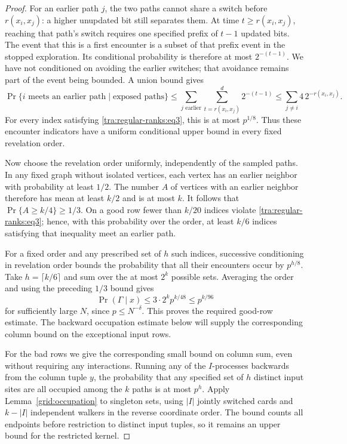 \begin{proof}
For an earlier path $j$, the two paths cannot share a switch before
$r(x_i,x_j)$: a higher unupdated bit still separates them. At time
$t\ge r(x_i,x_j)$, reaching that path's switch requires one
specified prefix of $t-1$ updated bits. The event that this is a
first encounter is a subset of that prefix event in the stopped
exploration. Its conditional probability is therefore at most
$2^{-(t-1)}$. We have not conditioned on avoiding the earlier
switches; that avoidance remains part of the event being bounded.
A union bound gives
\[
 \Pr\{i\text{ meets an earlier path}\mid\text{exposed paths}\}
 \le\sum_{j\text{ earlier}}\sum_{t=r(x_i,x_j)}^d2^{-(t-1)}
 \le\sum_{j\ne i}4\,2^{-r(x_i,x_j)}.
\]
For every index satisfying \eqref{tra:regular-ranks:eq3}, this
is at most $p^{1/8}$. Thus these encounter indicators have a
uniform conditional upper bound in every fixed revelation order.

Now choose the revelation order uniformly, independently of the
sampled paths. In any fixed graph without isolated vertices, each
vertex has an earlier neighbor with probability at least $1/2$.
The number $A$ of vertices with an earlier neighbor therefore has
mean at least $k/2$ and is at most $k$. It follows that
$\Pr\{A\ge k/4\}\ge1/3$. On a good row fewer than $k/20$
indices violate \eqref{tra:regular-ranks:eq3}; hence, with this
probability over the order, at least $k/6$ indices satisfying that
inequality meet an earlier path.

For a fixed order and any prescribed set of $h$ such indices,
successive conditioning in revelation order bounds the probability
that all their encounters occur by $p^{h/8}$. Take
$h=\lceil k/6\rceil$ and sum over the at most $2^k$ possible
sets. Averaging the order and using the preceding $1/3$ bound gives
\[
 \Pr(\Gamma\mid x)
 \le3\cdot2^k p^{k/48}\le p^{k/96}
\]
for sufficiently large $N$, since $p\le N^{-\delta}$.
This proves the required good-row estimate. The backward occupation
estimate below will supply the corresponding column bound on the
exceptional input rows.

For the bad rows we give the corresponding small bound on column sum, even without requiring any interactions. Running any of the \(I\)-processes backwards from the column tuple \(y\), the probability that any specified set of \(h\) distinct input sites are all occupied among the \(k\) paths is at most \(p^h\). Apply Lemma~\ref{grid:occupation} to singleton sets, using
$|I|$ jointly switched cards and $k-|I|$ independent walkers in the
reverse coordinate order. The bound counts all endpoints before
restriction to distinct input tuples, so it remains an upper bound
for the restricted kernel.


\end{proof}
